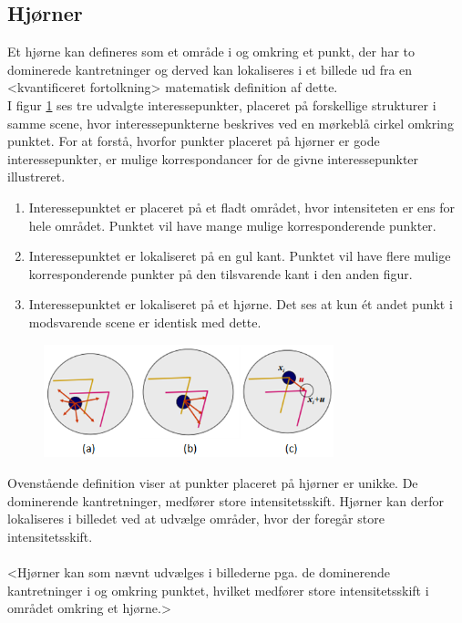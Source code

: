 \subsection*{Hjørner}\label{subsec:corner}
Et hjørne kan defineres som et område i og omkring et punkt, der har to dominerede kantretninger og derved kan lokaliseres i et billede ud fra en <kvantificeret fortolkning> matematisk definition af dette. \\ 
I figur \ref{app} ses tre udvalgte interessepunkter, placeret på forskellige strukturer i samme scene, hvor interessepunkterne beskrives ved en mørkeblå cirkel omkring punktet. For at forstå, hvorfor punkter placeret på hjørner er gode interessepunkter, er mulige korrespondancer for de givne interessepunkter illustreret.
\begin{enumerate}[label=\alph*]
\item{Interessepunktet er placeret på et fladt området, hvor intensiteten er ens for hele området. Punktet vil have mange mulige korresponderende punkter.}
\item{Interessepunktet er lokaliseret på en gul kant. Punktet vil have flere mulige korresponderende punkter på den tilsvarende kant i den anden figur.}
\item{Interessepunktet er lokaliseret på et hjørne. Det ses at kun ét andet punkt i modsvarende scene er identisk med dette.}
\end{enumerate}
\begin{figure}[H]
    \centering
    \includegraphics[width=0.75\textwidth]{fig/37.png}
    \vspace{-1em}   
    \begin{center}    
    \caption{\textcolor{gray}{\footnotesize \textit{
 }}}
    \label{app}
     \end{center}
    \vspace{-2.7em}  
  \end{figure}  
\noindent
Ovenstående definition viser at punkter placeret på hjørner er unikke. De dominerende kantretninger, medfører store intensitetsskift. Hjørner kan derfor lokaliseres i billedet ved at udvælge områder, hvor der foregår store intensitetsskift. \\ \\
<Hjørner kan som nævnt udvælges i billederne pga. de dominerende kantretninger i og omkring punktet, hvilket medfører store intensitetsskift i området omkring et hjørne.>